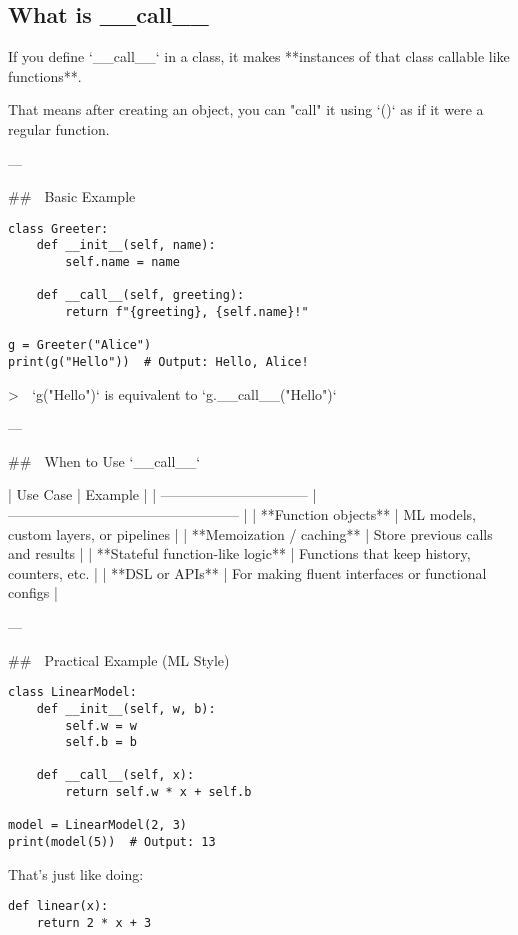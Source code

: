 \documentclass{article}
\begin{document}
\subsection{What is __call__}

If you define `__call__` in a class, it makes **instances of that class callable like functions**.

That means after creating an object, you can "call" it using `()` as if it were a regular function.

---

## 📌 Basic Example

\begin{lstlisting}
class Greeter:
    def __init__(self, name):
        self.name = name

    def __call__(self, greeting):
        return f"{greeting}, {self.name}!"

g = Greeter("Alice")
print(g("Hello"))  # Output: Hello, Alice!
\end{lstlisting}

> 🔎 `g("Hello")` is equivalent to `g.__call__("Hello")`

---

## 🧠 When to Use `__call__`

| Use Case                         | Example                                            |
| -------------------------------- | -------------------------------------------------- |
| **Function objects**             | ML models, custom layers, or pipelines             |
| **Memoization / caching**        | Store previous calls and results                   |
| **Stateful function-like logic** | Functions that keep history, counters, etc.        |
| **DSL or APIs**                  | For making fluent interfaces or functional configs |

---

## 🔬 Practical Example (ML Style)

\begin{lstlisting}
class LinearModel:
    def __init__(self, w, b):
        self.w = w
        self.b = b

    def __call__(self, x):
        return self.w * x + self.b

model = LinearModel(2, 3)
print(model(5))  # Output: 13
\end{lstlisting}

That’s just like doing:

\begin{lstlisting}
def linear(x):
    return 2 * x + 3
\end{lstlisting}
\end{document}
